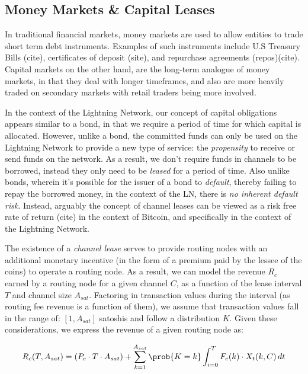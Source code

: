 \documentclass[10pt,a4paper]{article}
\theoremstyle{definition}
\begin{document}

\subsection{Money Markets \& Capital Leases} %

In traditional financial markets, money markets are used to allow entities to
trade short term debt instruments. Examples of such instruments include U.S
Treasury Bills (cite), certificates of deposit (site), and repurchase
agreements (repos)(cite). Capital markets on the other hand, are the long-term
analogue of money markets, in that they deal with longer timeframes, and also
are more heavily traded on secondary markets with retail traders being more
involved.

In the context of the Lightning Network, our concept of capital obligations
appears similar to a bond, in that we require a period of time for
which capital is allocated. However, unlike a bond, the committed funds
can only be used on the Lightning Network to provide a new type of service: the
\emph{propensity} to receive or send funds on the network. As a result, we
don't require funds in channels to be borrowed, instead they only need to be
\emph{leased} for a period of time. Also unlike bonds, wherein it's possible for
the issuer of a bond to \emph{default}, thereby failing to repay the borrowed
money, in the context of the LN, there is \emph{no inherent default risk}.
Instead, arguably the concept of channel leases can be viewed as a risk free
rate of return (cite) in the context of Bitcoin, and specifically in the context of the
Lightning Network. 

The existence of a \emph{channel lease} serves to provide routing nodes with an
additional monetary incentive (in the form of a premium paid by the lessee of
the coins) to operate a routing node. As a result, we can model the revenue
$R_c$ earned by a routing node for a given channel $C$, as a function of the
lease interval $T$ and channel size $A_{sat}$. Factoring in transaction values
during the interval (as routing fee revenue is a function of them), we assume
that transaction values fall in the range of: $[1, A_{sat}]$ satoshis and
follow a distribution $K$. Given these considerations, we express the revenue
of a given routing node as:

\begin{equation}
    R_c(T, A_{sat}) = (P_c \cdot T \cdot A_{sat}) + \sum_{k=1}^{A_{sat}} \prob{K=k} \int_{i=0}^{T} F_c(k) \cdot X_{t}(k, C) \,dt 
\end{equation}
\end{document}
